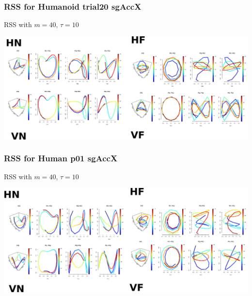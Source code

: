 \documentclass{beamer}
\begin{document}
\begin{frame}
\frametitle{RSS for Humanoid trial20 sgAccX}

RSS with $m=40$, $\tau=10$
\begin{adjustwidth}{-3em}{-3em}
\includegraphics[width=1.2\textwidth]{Robot_p20rss}
\end{adjustwidth}

\end{frame}




\begin{frame}
\frametitle{RSS for Human p01 sgAccX}

RSS with $m=40$, $\tau=10$
\begin{adjustwidth}{-3em}{-3em}
\includegraphics[width=1.2\textwidth]{Humans_p01rss}
\end{adjustwidth}

\end{frame}
\end{document}
